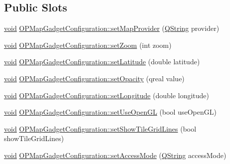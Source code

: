 \subsection*{\-Public \-Slots}
\begin{DoxyCompactItemize}
\item 
\hyperlink{group___u_a_v_objects_plugin_ga444cf2ff3f0ecbe028adce838d373f5c}{void} \hyperlink{group___o_p_map_plugin_gadde204abdb010d3db3f74c441e3b5f86}{\-O\-P\-Map\-Gadget\-Configuration\-::set\-Map\-Provider} (\hyperlink{group___u_a_v_objects_plugin_gab9d252f49c333c94a72f97ce3105a32d}{\-Q\-String} provider)
\item 
\hyperlink{group___u_a_v_objects_plugin_ga444cf2ff3f0ecbe028adce838d373f5c}{void} \hyperlink{group___o_p_map_plugin_ga890d5cb95e80f44a580a0e3ed6ff3be7}{\-O\-P\-Map\-Gadget\-Configuration\-::set\-Zoom} (int zoom)
\item 
\hyperlink{group___u_a_v_objects_plugin_ga444cf2ff3f0ecbe028adce838d373f5c}{void} \hyperlink{group___o_p_map_plugin_gab759e5b231114788ee1e2e86fcbdec91}{\-O\-P\-Map\-Gadget\-Configuration\-::set\-Latitude} (double latitude)
\item 
\hyperlink{group___u_a_v_objects_plugin_ga444cf2ff3f0ecbe028adce838d373f5c}{void} \hyperlink{group___o_p_map_plugin_gac8ae59a00d15d1f1134b3908d4467567}{\-O\-P\-Map\-Gadget\-Configuration\-::set\-Opacity} (qreal value)
\item 
\hyperlink{group___u_a_v_objects_plugin_ga444cf2ff3f0ecbe028adce838d373f5c}{void} \hyperlink{group___o_p_map_plugin_ga325a0c461cf8655200b500b27c814250}{\-O\-P\-Map\-Gadget\-Configuration\-::set\-Longitude} (double longitude)
\item 
\hyperlink{group___u_a_v_objects_plugin_ga444cf2ff3f0ecbe028adce838d373f5c}{void} \hyperlink{group___o_p_map_plugin_gab274a818972885ce68aba549d8d6c683}{\-O\-P\-Map\-Gadget\-Configuration\-::set\-Use\-Open\-G\-L} (bool use\-Open\-G\-L)
\item 
\hyperlink{group___u_a_v_objects_plugin_ga444cf2ff3f0ecbe028adce838d373f5c}{void} \hyperlink{group___o_p_map_plugin_ga4463bef2ed6bd9bd5c0048b1a4510fa1}{\-O\-P\-Map\-Gadget\-Configuration\-::set\-Show\-Tile\-Grid\-Lines} (bool show\-Tile\-Grid\-Lines)
\item 
\hyperlink{group___u_a_v_objects_plugin_ga444cf2ff3f0ecbe028adce838d373f5c}{void} \hyperlink{group___o_p_map_plugin_ga5d483b0cef7387c2a4bb3df4a27b453f}{\-O\-P\-Map\-Gadget\-Configuration\-::set\-Access\-Mode} (\hyperlink{group___u_a_v_objects_plugin_gab9d252f49c333c94a72f97ce3105a32d}{\-Q\-String} access\-Mode)

\end{DoxyCompactItemize}

